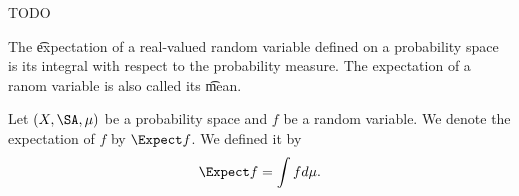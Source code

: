 

TODO


The \t{expectation}
of a real-valued random variable
defined on a probability space
is its integral
with respect to
the probability measure.
The expectation of a ranom variable is also called its \t{mean}.


Let $(X, \SA, \mu)$
be a probability space
and $f$ be a random variable.
We denote the expectation
of $f$ by $\Expect f$.
We defined it by
\[
  \Expect f = \int f d\mu.
\]


\blankpage
